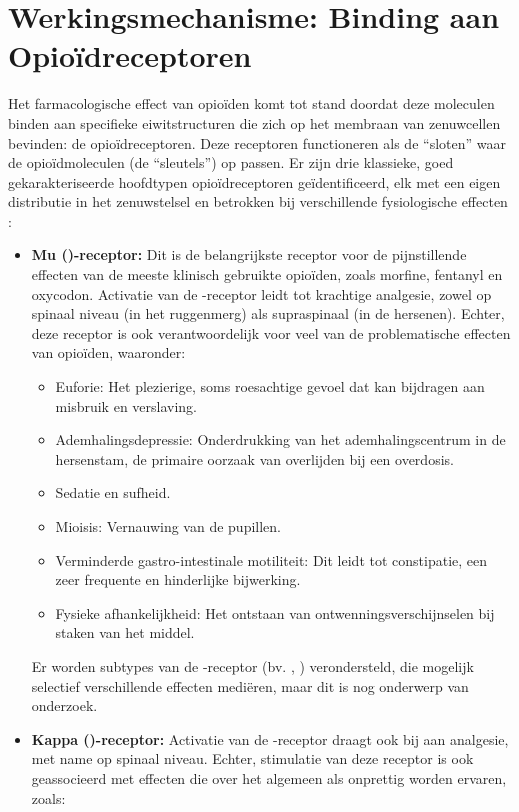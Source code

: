 \documentclass[11pt, a4paper]{report} %
\begin{document}
\section{Werkingsmechanisme: Binding aan Opioïdreceptoren}
Het farmacologische effect van opioïden komt tot stand doordat deze moleculen binden aan specifieke eiwitstructuren die zich op het membraan van zenuwcellen bevinden: de opioïdreceptoren. Deze receptoren functioneren als de \enquote{sloten} waar de opioïdmoleculen (de \enquote{sleutels}) op passen. Er zijn drie klassieke, goed gekarakteriseerde hoofdtypen opioïdreceptoren geïdentificeerd, elk met een eigen distributie in het zenuwstelsel en betrokken bij verschillende fysiologische effecten \parencite{StatPearlsOpioidReceptor, IUPHAROpioidReceptors, PMC2015BasicOpioidPharm}:
\begin{itemize}
    \item \textbf{Mu (\textmu)-receptor:} Dit is de belangrijkste receptor voor de pijnstillende effecten van de meeste klinisch gebruikte opioïden, zoals morfine, fentanyl en oxycodon. Activatie van de \textmu-receptor leidt tot krachtige analgesie, zowel op spinaal niveau (in het ruggenmerg) als supraspinaal (in de hersenen). Echter, deze receptor is ook verantwoordelijk voor veel van de problematische effecten van opioïden, waaronder:
        \begin{itemize}
            \item Euforie: Het plezierige, soms roesachtige gevoel dat kan bijdragen aan misbruik en verslaving.
            \item Ademhalingsdepressie: Onderdrukking van het ademhalingscentrum in de hersenstam, de primaire oorzaak van overlijden bij een overdosis.
            \item Sedatie en sufheid.
            \item Mioisis: Vernauwing van de pupillen.
            \item Verminderde gastro-intestinale motiliteit: Dit leidt tot constipatie, een zeer frequente en hinderlijke bijwerking.
            \item Fysieke afhankelijkheid: Het ontstaan van ontwenningsverschijnselen bij staken van het middel.
        \end{itemize}
        Er worden subtypes van de \textmu-receptor (bv. , ) verondersteld, die mogelijk selectief verschillende effecten mediëren, maar dit is nog onderwerp van onderzoek.
    \item \textbf{Kappa (\textkappa)-receptor:} Activatie van de \textkappa-receptor draagt ook bij aan analgesie, met name op spinaal niveau. Echter, stimulatie van deze receptor is ook geassocieerd met effecten die over het algemeen als onprettig worden ervaren, zoals:

\end{itemize}
\end{document}
